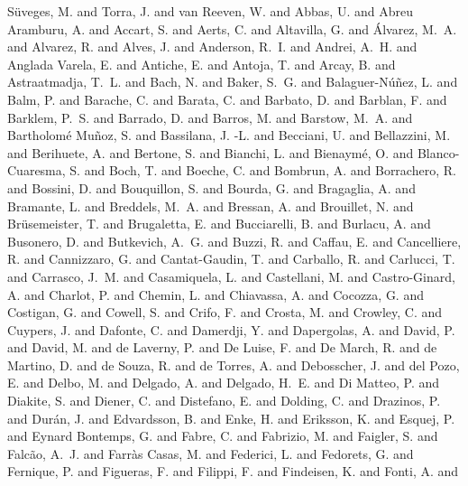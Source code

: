 \documentclass[a4paper,fleqn,usenatbib]{mnras}
\begin{document}
{{         {S{\"u}veges}, M. and {Torra}, J. and {van Reeven}, W. and {Abbas}, U. and
         {Abreu Aramburu}, A. and {Accart}, S. and {Aerts}, C. and
         {Altavilla}, G. and {{\'A}lvarez}, M.~A. and {Alvarez}, R. and
         {Alves}, J. and {Anderson}, R.~I. and {Andrei}, A.~H. and
         {Anglada Varela}, E. and {Antiche}, E. and {Antoja}, T. and
         {Arcay}, B. and {Astraatmadja}, T.~L. and {Bach}, N. and
         {Baker}, S.~G. and {Balaguer-N{\'u}{\~n}ez}, L. and {Balm}, P. and
         {Barache}, C. and {Barata}, C. and {Barbato}, D. and {Barblan}, F. and
         {Barklem}, P.~S. and {Barrado}, D. and {Barros}, M. and
         {Barstow}, M.~A. and {Bartholom{\'e} Mu{\~n}oz}, S. and
         {Bassilana}, J. -L. and {Becciani}, U. and {Bellazzini}, M. and
         {Berihuete}, A. and {Bertone}, S. and {Bianchi}, L. and
         {Bienaym{\'e}}, O. and {Blanco-Cuaresma}, S. and {Boch}, T. and
         {Boeche}, C. and {Bombrun}, A. and {Borrachero}, R. and {Bossini}, D. and
         {Bouquillon}, S. and {Bourda}, G. and {Bragaglia}, A. and
         {Bramante}, L. and {Breddels}, M.~A. and {Bressan}, A. and
         {Brouillet}, N. and {Br{\"u}semeister}, T. and {Brugaletta}, E. and
         {Bucciarelli}, B. and {Burlacu}, A. and {Busonero}, D. and
         {Butkevich}, A.~G. and {Buzzi}, R. and {Caffau}, E. and
         {Cancelliere}, R. and {Cannizzaro}, G. and {Cantat-Gaudin}, T. and
         {Carballo}, R. and {Carlucci}, T. and {Carrasco}, J.~M. and
         {Casamiquela}, L. and {Castellani}, M. and {Castro-Ginard}, A. and
         {Charlot}, P. and {Chemin}, L. and {Chiavassa}, A. and {Cocozza}, G. and
         {Costigan}, G. and {Cowell}, S. and {Crifo}, F. and {Crosta}, M. and
         {Crowley}, C. and {Cuypers}, J. and {Dafonte}, C. and {Damerdji}, Y. and
         {Dapergolas}, A. and {David}, P. and {David}, M. and {de Laverny}, P. and
         {De Luise}, F. and {De March}, R. and {de Martino}, D. and
         {de Souza}, R. and {de Torres}, A. and {Debosscher}, J. and
         {del Pozo}, E. and {Delbo}, M. and {Delgado}, A. and {Delgado}, H.~E. and
         {Di Matteo}, P. and {Diakite}, S. and {Diener}, C. and {Distefano}, E. and
         {Dolding}, C. and {Drazinos}, P. and {Dur{\'a}n}, J. and
         {Edvardsson}, B. and {Enke}, H. and {Eriksson}, K. and {Esquej}, P. and
         {Eynard Bontemps}, G. and {Fabre}, C. and {Fabrizio}, M. and
         {Faigler}, S. and {Falc{\~a}o}, A.~J. and {Farr{\`a}s Casas}, M. and
         {Federici}, L. and {Fedorets}, G. and {Fernique}, P. and
         {Figueras}, F. and {Filippi}, F. and {Findeisen}, K. and {Fonti}, A. and
}}
\end{document}
